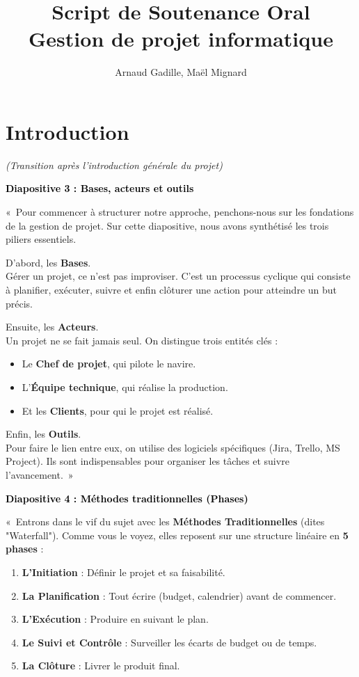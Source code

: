 \documentclass[12pt, a4paper]{article}
\title{Script de Soutenance Oral\\ \large Gestion de projet informatique}
\author{Arnaud Gadille, Maël Mignard}
\date{}
\newcommand{\slideheader}[2]{
    \vspace{1cm}
    \noindent
    \colorbox{slideheader!20}{
        \parbox{\dimexpr\linewidth-2\fboxsep\relax}{
            \textbf{\Large \textcolor{black}{Diapositive #1 : #2}}
        }
    }
    \vspace{0.5cm}
}
\begin{document}
\maketitle

\section*{Introduction}
\textit{(Transition après l'introduction générale du projet)}

\slideheader{3}{Bases, acteurs et outils}

«~Pour commencer à structurer notre approche, penchons-nous sur les fondations de la gestion de projet. Sur cette diapositive, nous avons synthétisé les trois piliers essentiels.

D'abord, les \textbf{Bases}.\\
Gérer un projet, ce n'est pas improviser. C'est un processus cyclique qui consiste à planifier, exécuter, suivre et enfin clôturer une action pour atteindre un but précis.

Ensuite, les \textbf{Acteurs}.\\
Un projet ne se fait jamais seul. On distingue trois entités clés :
\begin{itemize}
    \item Le \textbf{Chef de projet}, qui pilote le navire.
    \item L'\textbf{Équipe technique}, qui réalise la production.
    \item Et les \textbf{Clients}, pour qui le projet est réalisé.
\end{itemize}

Enfin, les \textbf{Outils}.\\
Pour faire le lien entre eux, on utilise des logiciels spécifiques (Jira, Trello, MS Project). Ils sont indispensables pour organiser les tâches et suivre l'avancement.~»

\slideheader{4}{Méthodes traditionnelles (Phases)}

«~Entrons dans le vif du sujet avec les \textbf{Méthodes Traditionnelles} (dites "Waterfall").
Comme vous le voyez, elles reposent sur une structure linéaire en \textbf{5 phases} :

\begin{enumerate}
    \item \textbf{L'Initiation} : Définir le projet et sa faisabilité.
    \item \textbf{La Planification} : Tout écrire (budget, calendrier) avant de commencer.
    \item \textbf{L'Exécution} : Produire en suivant le plan.
    \item \textbf{Le Suivi et Contrôle} : Surveiller les écarts de budget ou de temps.
    \item \textbf{La Clôture} : Livrer le produit final.
\end{enumerate}
\end{document}
